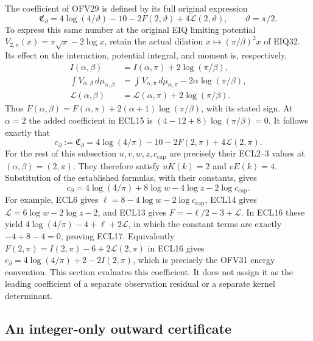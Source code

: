 \documentclass[11pt,a4paper]{article}
\begin{document}
The coefficient of OFV29 is defined by its full original expression
\begin{equation}\tag{ECL15}
\mathfrak C_{\partial}
=4\log(4/\vartheta)-10
-2F(2,\vartheta)+4\mathcal L(2,\vartheta),
\qquad \vartheta=\pi/2.
\end{equation}
To express this same number at the original EIQ limiting potential
$V_{2,\pi}(x)=\pi\sqrt{x}-2\log x$, retain the actual dilation
$x\mapsto(\pi/\beta)^2x$ of EIQ32. Its effect on the interaction,
potential integral, and moment is, respectively,
\[
\begin{split}
I(\alpha,\beta)&=I(\alpha,\pi)+2\log(\pi/\beta),\\
\int V_{\alpha,\beta}\,d\mu_{\alpha,\beta}
&=\int V_{\alpha,\pi}\,d\mu_{\alpha,\pi}
   -2\alpha\log(\pi/\beta),\\
\mathcal L(\alpha,\beta)&=\mathcal L(\alpha,\pi)
   +2\log(\pi/\beta).
\end{split}
\]
Thus $F(\alpha,\beta)=F(\alpha,\pi)
+2(\alpha+1)\log(\pi/\beta)$, with its stated sign.
At $\alpha=2$ the added coefficient in ECL15 is
$(4-12+8)\log(\pi/\beta)=0$. It follows exactly that
\begin{equation}\tag{ECL16}
c_{\partial}:=\mathfrak C_{\partial}
=4\log(4/\pi)-10-2F(2,\pi)+4\mathcal L(2,\pi).
\end{equation}
For the rest of this subsection $u,v,w,z,c_{\mathrm{cap}}$ are
precisely their ECL2--3 values at $(\alpha,\beta)=(2,\pi)$.
They therefore satisfy $uK(k)=2$ and $vE(k)=4$.
Substitution of the established formulas, with their constants,
gives
\begin{equation}\tag{ECL17}
\boxed{\displaystyle
c_{\partial}
=4\log(4/\pi)+8\log w-4\log z-2\log c_{\mathrm{cap}}.}
\end{equation}
For example, ECL6 gives
$\ell=8-4\log w-2\log c_{\mathrm{cap}}$, ECL14 gives
$\mathcal L=6\log w-2\log z-2$, and ECL13 gives
$F=-\ell/2-3+\mathcal L$. In ECL16 these yield
$4\log(4/\pi)-4+\ell+2\mathcal L$, in which the constant
terms are exactly $-4+8-4=0$, proving ECL17.
Equivalently $F(2,\pi)=I(2,\pi)-6+2\mathcal L(2,\pi)$
in ECL16 gives
$c_{\partial}=4\log(4/\pi)+2-2I(2,\pi)$,
which is precisely the OFV31 energy convention.
This section evaluates this coefficient. It does not assign it
as the leading coefficient of a separate observation residual
or a separate kernel determinant.

\subsection{An integer-only outward certificate}
\end{document}

